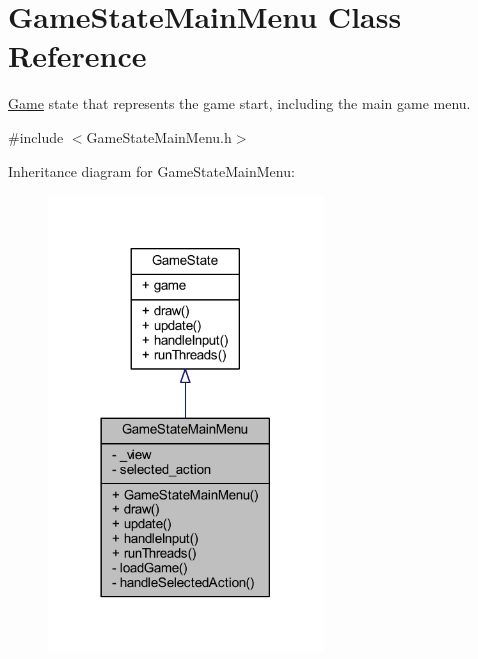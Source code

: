 \hypertarget{class_game_state_main_menu}{\section{Game\+State\+Main\+Menu Class Reference}
\label{class_game_state_main_menu}
}


\hyperlink{class_game}{Game} state that represents the game start, including the main game menu.  




{\ttfamily \#include $<$Game\+State\+Main\+Menu.\+h$>$}



Inheritance diagram for Game\+State\+Main\+Menu\+:\nopagebreak
\begin{figure}[H]
\begin{center}
\leavevmode
\includegraphics[width=206pt]{class_game_state_main_menu__inherit__graph}
\end{center}
\end{figure}


